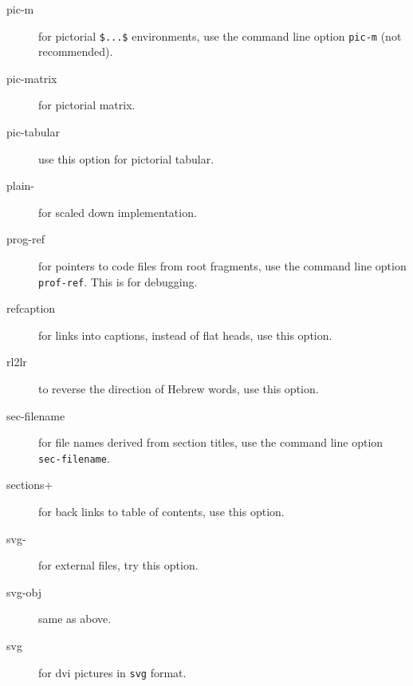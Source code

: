 \documentclass[a4paper]{article}
\begin{document}
\begin{description}
\item[pic-m] for pictorial \verb=$...$= environments, use the command
  line option \verb=pic-m= (not recommended).

\item[pic-matrix] for pictorial matrix.




\item[pic-tabular] use this option for pictorial tabular.

\item[plain-] for scaled down implementation.




\item[prog-ref] for pointers to code files from root fragments, use
  the command line option \verb=prof-ref=. This is for debugging.

\item[refcaption] for links into captions, instead of flat heads, use
  this option.

\item[rl2lr] to reverse the direction of Hebrew words, use this
  option.

\item[sec-filename] for file names derived from section titles, use
  the command line option \verb=sec-filename=.

\item[sections+] for back links to table of contents, use this option.


\item[svg-] for external \svg files, try this option.

\item[svg-obj] same as above.

\item[svg] for dvi pictures in \verb=svg= format.


\end{description}
\end{document}
